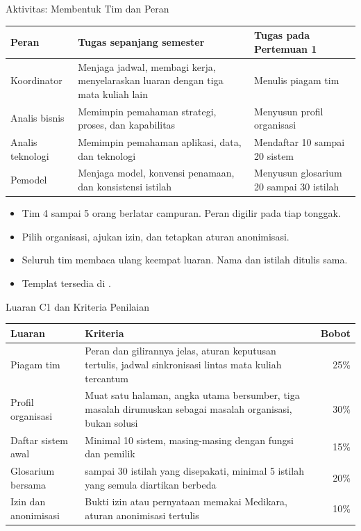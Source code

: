 \documentclass[aspectratio=169, table, 12pt]{beamer}
\begin{document}
\begin{frame}{{\Large Aktivitas: Membentuk Tim dan Peran}}
  \scriptsize
  \begin{tabularx}{\textwidth}{>{\raggedright\arraybackslash}p{2.2cm}
      >{\raggedright\arraybackslash}X >{\raggedright\arraybackslash}p{3.8cm}}
    \hline
    \textbf{Peran} & \textbf{Tugas sepanjang semester} & \textbf{Tugas pada Pertemuan 1} \\
    \hline
    Koordinator & Menjaga jadwal, membagi kerja, menyelaraskan luaran dengan tiga mata kuliah lain & Menulis piagam tim \\
    \hline
    Analis bisnis & Memimpin pemahaman strategi, proses, dan kapabilitas & Menyusun profil organisasi \\
    \hline
    Analis teknologi & Memimpin pemahaman aplikasi, data, dan teknologi & Mendaftar 10 sampai 20 sistem \\
    \hline
    Pemodel & Menjaga model, konvensi penamaan, dan konsistensi istilah & Menyusun glosarium 20 sampai 30 istilah \\
    \hline
  \end{tabularx}

  \vspace{6pt}
  \small
  \begin{itemize}
    \item Tim 4 sampai 5 orang berlatar campuran. Peran digilir pada tiap tonggak.
    \item Pilih organisasi, ajukan izin, dan tetapkan aturan anonimisasi.
    \item Seluruh tim membaca ulang keempat luaran. Nama dan istilah ditulis sama.
    \item Templat tersedia di .
  \end{itemize}
\end{frame}

\begin{frame}{{\Large Luaran C1 dan Kriteria Penilaian}}
  \footnotesize
  \begin{tabularx}{\textwidth}{>{\raggedright\arraybackslash}p{2.8cm}
      >{\raggedright\arraybackslash}X r}
    \hline
    \textbf{Luaran} & \textbf{Kriteria} & \textbf{Bobot} \\
    \hline
    Piagam tim & Peran dan gilirannya jelas, aturan keputusan tertulis, jadwal sinkronisasi lintas mata kuliah tercantum & 25\% \\
    \hline
    Profil organisasi & Muat satu halaman, angka utama bersumber, tiga masalah dirumuskan sebagai masalah organisasi, bukan solusi & 30\% \\
    \hline
    Daftar sistem awal & Minimal 10 sistem, masing-masing dengan fungsi dan pemilik & 15\% \\
    \hline
    Glosarium bersama & 20 sampai 30 istilah yang disepakati, minimal 5 istilah yang semula diartikan berbeda & 20\% \\
    \hline
    Izin dan anonimisasi & Bukti izin atau pernyataan memakai Medikara, aturan anonimisasi tertulis & 10\% \\
    \hline
  \end{tabularx}
\end{frame}
\end{document}

